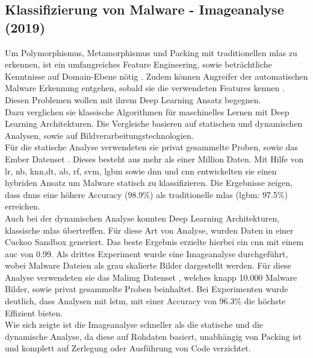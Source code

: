 \documentclass[
    12pt, %
    DIV10,
    ngerman, %
    a4paper, %
    oneside, %
    titlepage, %
    parskip=half, %
    headings=normal, %
    listof=totoc, %
    bibliography=totoc, %
    index=totoc, %
    captions=tableheading, %
    final %
]{scrreprt}
\begin{document}
%
\subsection{Klassifizierung von Malware - Imageanalyse (2019)}\label{ember}
Um Polymorphismus, Metamorphismus und Packing mit traditionellen \ac{mlas} zu erkennen, ist ein umfangreiches Feature Engineering, sowie beträchtliche Kenntnisse auf Domain-Ebene nötig \parencite{rhode2018early}. Zudem können Angreifer der automatischen Malware Erkennung entgehen, sobald sie die verwendeten Features kennen \parencite{anderson2017evading}. Diesen Problemen wollen \textcite{Vinayakumar2019} mit ihrem Deep Learning Ansatz begegnen.\\
Dazu verglichen sie klassische Algorithmen für maschinelles Lernen mit Deep Learning Architekturen. Die Vergleiche basieren auf statischen und dynamischen Analysen, sowie auf Bildverarbeitungstechnologien.\\
Für die statische Analyse verwendeten sie privat gesammelte Proben, sowie das Ember Datenset \parencite{anderson2018ember}. Dieses besteht aus mehr als einer Million Daten. Mit Hilfe von \ac{lr}, \ac{nb}, \ac{knn},\ac{dt}, \ac{ab}, \ac{rf}, \ac{svm}, \ac{lgbm} sowie \ac{dnn} und \ac{cnn} entwickelten sie einen hybriden Ansatz um Malware statisch zu klassifizieren. Die Ergebnisse zeigen, dass \ac{dnns} eine höhere Accuracy (98.9\%) als traditionelle \ac{mlas} (\ac{lgbm}: 97.5\%) erreichen.\\
Auch bei der dynamischen Analyse konnten Deep Learning Architekturen, klassische \ac{mlas} übertreffen. Für diese Art von Analyse, wurden Daten in einer Cuckoo Sandbox generiert. Das beste Ergebnis erzielte hierbei ein \ac{cnn} mit einem \ac{auc} von 0.99. Als drittes Experiment wurde eine Imageanalyse durchgeführt, wobei Malware Dateien als grau skalierte Bilder dargestellt werden. Für diese Analyse verwendeten sie das Malimg Datenset \parencite{nataraj2011malware}, welches knapp 10.000 Malware Bilder, sowie privat gesammelte Proben beinhaltet. Bei Experimenten wurde deutlich, dass Analysen mit \ac{lstm}, mit einer Accuracy von 96.3\% die höchste Effizient bieten.\\
Wie sich zeigte ist die Imageanalyse schneller als die statische und die dynamische Analyse, da diese auf Rohdaten basiert, unabhängig von Packing ist und komplett auf Zerlegung oder Ausführung von Code verzichtet. 
\end{document}
